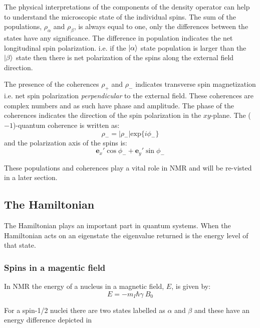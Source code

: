 The physical interpretations of the components of the density operator can help to understand the microscopic state
of the individual spins. The sum of the populations, $\rho_\alpha$ and $\rho_\beta$, is always equal to one, only the differences between the states
have any significance. The difference in population indicates the net longitudinal spin polarization. i.e. if the
$\ket{\alpha}$ state population is larger than the $\ket{\beta}$ state then there is net polarization of the spins
along the external field direction.

The presence of the coherences $\rho_+$ and $\rho_-$ indicates transverse spin magnetization i.e. net spin
polarization \textit{perpendicular} to the external field. These coherences are complex numbers and as
such have phase and amplitude. The phase of the coherences indicates the direction of the spin polarization
in the $xy$-plane. The ($-1$)-quantum coherence is written as:
\begin{equation}
  \rho_-= |\rho_-|\text{exp}\{i\phi_-\}
\end{equation}
and the polarization  axis of the spins is:
\begin{equation}
  \mathbf{e}_x'\cos\phi_- + \mathbf{e}_y'\sin\phi_-
\end{equation}

These populations and coherences play a vital role in NMR and will be re-visted in a later section.

\subsection{The Hamiltonian}\label{Hamiltonian}

The Hamiltonian plays an important part in quantum systems. When the Hamiltonian acts on an eigenstate
the eigenvalue returned is the energy level of that state.

\subsubsection{Spins in a magentic field}

In NMR the energy of a nucleus in a magnetic field, $E$, is given by:
\begin{equation}
  E = -m_I\hbar\gamma~B_0
\end{equation}

For a spin-1/2 nuclei there are two states labelled as $\alpha$ and $\beta$
and these have an energy difference depicted in 

